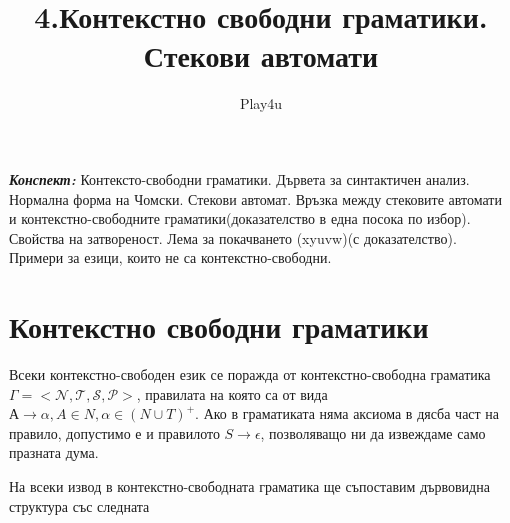 \documentclass[11pt]{article} %
\title{4.Контекстно свободни граматики. Стекови автомати}
\author{Play4u}
\begin{document}
\maketitle

\newcommand{\lrangle}[1]{\left\langle #1 \right\rangle}

\newcommand{\belongsTo}{\in}
\newcommand{\notBelongsTo}{\centernot\in}

\newcommand{\oversetModels}[1]{\overset{#1}{\models}}

\newcommand{\kda}{A = <Q, X, q_{0}, \delta, F>}
\newcommand{\cfg}{\Gamma = <\mathcal{N}, \mathcal{T}, \mathcal{S}, \mathcal{P}>}
\newcommand{\cfgVers}{G = \langle V, \Sigma, R, S \rangle}
\newcommand{\nsa}{A = <Q, X, Z, q_{0}, z_{0}, \delta, F>}

\newcommand{\italicBold}[1]{\textbf{\emph{#1}}}
\newcommand{\definition}{\italicBold{Дефиниция: }}
\newcommand{\theorem}{\italicBold{Теорема: }}
\newcommand{\lemma}{\italicBold{Лема: }}
\newcommand{\proof}{\italicBold{Доказателство: }}

\newcommand{\curlies}[1]{\{#1\}}

\newcommand{\enumNum}{\renewcommand{\theenumi}{\arabic{enumi}}}
\newcommand{\enumlet}{\renewcommand{\theenumi}{\alph{enumi}}}

\italicBold{Конспект:} Контексто-свободни граматики. Дървета за синтактичен анализ. Нормална форма на Чомски. Стекови автомат. Връзка между стековите автомати и контекстно-свободните граматики(доказателство в една посока по избор). Свойства на затвореност. Лема за покачването (xyuvw)(с доказателство). Примери за езици, които не са контекстно-свободни.

\section{Контекстно свободни граматики}
Всеки контекстно-свободен език се поражда от контекстно-свободна граматика $\cfg$, правилата на която са от вида $А \to \alpha, A \in N, \alpha \in (N \cup T)^{+}$.
Ако в граматиката няма аксиома в дясба част на правило, допустимо е и правилото $S \to \epsilon$, позволяващо ни да извеждаме само празната дума. \par

На всеки извод в контекстно-свободната граматика ще  съпоставим дървовидна структура със следната 
\end{document}
